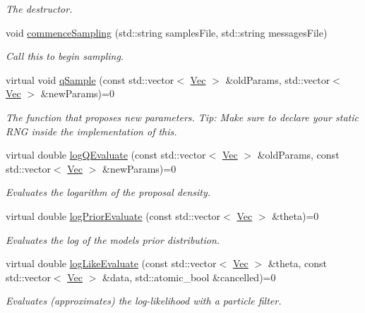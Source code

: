 \begin{DoxyCompactItemize}
\begin{DoxyCompactList}\small\item\em The destructor. \end{DoxyCompactList}\item 
void \hyperlink{classPmmh_ac035560cb209fb5cade23e431b5e1fd3}{commence\+Sampling} (std\+::string samples\+File, std\+::string messages\+File)
\begin{DoxyCompactList}\small\item\em Call this to begin sampling. \end{DoxyCompactList}\item 
virtual void \hyperlink{classPmmh_a7ada4decd5df894376c74e3ddba5daa1}{q\+Sample} (const std\+::vector$<$ \hyperlink{apf__filter_8h_a4c7df05c6f5e8a0d15ae14bcdbc07152}{Vec} $>$ \&old\+Params, std\+::vector$<$ \hyperlink{apf__filter_8h_a4c7df05c6f5e8a0d15ae14bcdbc07152}{Vec} $>$ \&new\+Params)=0
\begin{DoxyCompactList}\small\item\em The function that proposes new parameters. Tip\+: Make sure to declare your static R\+NG inside the implementation of this. \end{DoxyCompactList}\item 
virtual double \hyperlink{classPmmh_af8d3fdbc3f3c998670266a3032a53e80}{log\+Q\+Evaluate} (const std\+::vector$<$ \hyperlink{apf__filter_8h_a4c7df05c6f5e8a0d15ae14bcdbc07152}{Vec} $>$ \&old\+Params, const std\+::vector$<$ \hyperlink{apf__filter_8h_a4c7df05c6f5e8a0d15ae14bcdbc07152}{Vec} $>$ \&new\+Params)=0
\begin{DoxyCompactList}\small\item\em Evaluates the logarithm of the proposal density. \end{DoxyCompactList}\item 
virtual double \hyperlink{classPmmh_a265ca1c1380d0ebc052be2c5424a0d3b}{log\+Prior\+Evaluate} (const std\+::vector$<$ \hyperlink{apf__filter_8h_a4c7df05c6f5e8a0d15ae14bcdbc07152}{Vec} $>$ \&theta)=0
\begin{DoxyCompactList}\small\item\em Evaluates the log of the model\textquotesingle{}s prior distribution. \end{DoxyCompactList}\item 
virtual double \hyperlink{classPmmh_a293931e138576f063aab7e46228f0266}{log\+Like\+Evaluate} (const std\+::vector$<$ \hyperlink{apf__filter_8h_a4c7df05c6f5e8a0d15ae14bcdbc07152}{Vec} $>$ \&theta, const std\+::vector$<$ \hyperlink{apf__filter_8h_a4c7df05c6f5e8a0d15ae14bcdbc07152}{Vec} $>$ \&data, std\+::atomic\+\_\+bool \&cancelled)=0
\begin{DoxyCompactList}\small\item\em Evaluates (approximates) the log-\/likelihood with a particle filter. \end{DoxyCompactList}\end{DoxyCompactItemize}


